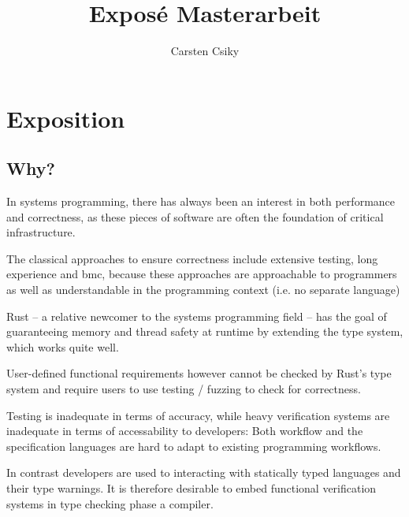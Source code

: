 \documentclass[11pt]{article}
\title{\textbf{Exposé Masterarbeit}}
\author{Carsten Csiky}
\date{}
\begin{document}
\maketitle

\section{Exposition}

\subsection{Why?}

In systems programming, there has always been an interest in both performance and correctness, as 
these pieces of software are often the foundation of critical infrastructure.

The classical approaches to ensure correctness include extensive testing, long experience and bmc, because these approaches are approachable to programmers as well as understandable in the programming context (i.e. no separate language)

Rust -- a relative newcomer to the systems programming field -- has the goal of guaranteeing memory and thread safety at runtime by extending the type system, which works quite well.

User-defined functional requirements however cannot be checked by Rust's type system and require users to use testing / fuzzing to check for correctness.

Testing is inadequate in terms of accuracy, while heavy verification systems are inadequate in terms of accessability to developers:
Both workflow and the specification languages are hard to adapt to existing programming workflows.

In contrast developers are used to interacting with statically typed languages and their type warnings. It is therefore desirable to embed functional verification systems in type checking phase a compiler.



\end{document}
